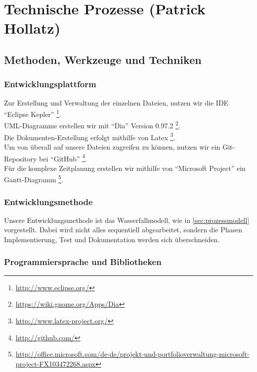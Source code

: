 \documentclass[fontsize=12pt,paper=a4,twoside]{scrartcl}
\begin{document}

\section{Technische Prozesse (Patrick Hollatz)}
\subsection{Methoden, Werkzeuge und Techniken}
\subsubsection{Entwicklungsplattform}
Zur Erstellung und Verwaltung der einzelnen Dateien, nutzen wir die IDE "`Eclipse Kepler"' \footnote{\url{http://www.eclipse.org/}}.\\
UML-Diagramme erstellen wir mit "`Dia"' Version 0.97.2 \footnote{\url{https://wiki.gnome.org/Apps/Dia}}.\\
Die Dokumenten-Erstellung erfolgt mithilfe von Latex \footnote{\url{http://www.latex-project.org/}}.\\
Um von überall auf unsere Dateien zugreifen zu können, nutzen wir ein Git-Repository bei "`GitHub"' \footnote{\url{http://github.com/}}.\\
Für die komplexe Zeitplanung erstellen wir mithilfe von "`Microsoft Project"' ein Gantt-Diagramm \footnote{\url{http://office.microsoft.com/de-de/projekt-und-portfolioverwaltung-microsoft-project-FX103472268.aspx}}.

\subsubsection{Entwicklungsmethode}

Unsere Entwicklungsmethode ist das Wasserfallmodell, wie in \ref{sec:prozessmodell} vorgestellt. Dabei wird nicht alles sequentiell abgearbeitet, sondern die Phasen Implementierung, Test und Dokumentation werden sich überschneiden.

\subsubsection{Programmiersprache und Bibliotheken}
\end{document}
